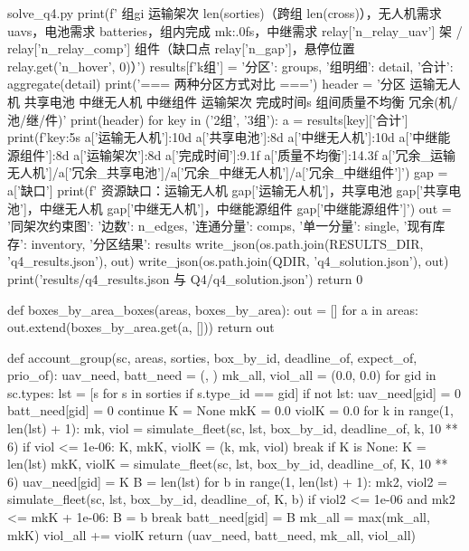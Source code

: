\documentclass[bwprint]{gmcmthesis}
\begin{document}
\begin{appendices}
\begin{Python}{solve\_q4.py}
            print(f'    组{gi} 运输架次 {len(sorties)}（跨组 {len(cross)}），无人机需求 {uavs}，电池需求 {batteries}，组内完成 {mk:.0f}s，中继需求 {relay['n_relay_uav']} 架 / {relay['n_relay_comp']} 组件（缺口点 {relay['n_gap']}，悬停位置 {relay.get('n_hover', 0)}）')
        results[f'{k}组'] = {'分区': groups, '组明细': detail, '合计': aggregate(detail)}
    print('\n=== 两种分区方式对比 ===')
    header = '分区  运输无人机 共享电池 中继无人机 中继组件 运输架次 完成时间s 组间质量不均衡 冗余(机/池/继/件)'
    print(header)
    for key in ('2组', '3组'):
        a = results[key]['合计']
        print(f'{key:5s} {a['运输无人机']:10d} {a['共享电池']:8d} {a['中继无人机']:10d} {a['中继能源组件']:8d} {a['运输架次']:8d} {a['完成时间']:9.1f} {a['质量不均衡']:14.3f} {a['冗余_运输无人机']}/{a['冗余_共享电池']}/{a['冗余_中继无人机']}/{a['冗余_中继组件']}')
        gap = a['缺口']
        print(f'      资源缺口：运输无人机 {gap['运输无人机']}，共享电池 {gap['共享电池']}，中继无人机 {gap['中继无人机']}，中继能源组件 {gap['中继能源组件']}')
    out = {'同架次约束图': {'边数': n_edges, '连通分量': comps, '单一分量': single}, '现有库存': inventory, '分区结果': results}
    write_json(os.path.join(RESULTS_DIR, 'q4_results.json'), out)
    write_json(os.path.join(QDIR, 'q4_solution.json'), out)
    print(' results/q4_results.json 与 Q4/q4_solution.json')
    return 0

def boxes_by_area_boxes(areas, boxes_by_area):
    out = []
    for a in areas:
        out.extend(boxes_by_area.get(a, []))
    return out

def account_group(sc, areas, sorties, box_by_id, deadline_of, expect_of, prio_of):
    uav_need, batt_need = ({}, {})
    mk_all, viol_all = (0.0, 0.0)
    for gid in sc.types:
        lst = [s for s in sorties if s.type_id == gid]
        if not lst:
            uav_need[gid] = 0
            batt_need[gid] = 0
            continue
        K = None
        mkK = 0.0
        violK = 0.0
        for k in range(1, len(lst) + 1):
            mk, viol = simulate_fleet(sc, lst, box_by_id, deadline_of, k, 10 ** 6)
            if viol <= 1e-06:
                K, mkK, violK = (k, mk, viol)
                break
        if K is None:
            K = len(lst)
            mkK, violK = simulate_fleet(sc, lst, box_by_id, deadline_of, K, 10 ** 6)
        uav_need[gid] = K
        B = len(lst)
        for b in range(1, len(lst) + 1):
            mk2, viol2 = simulate_fleet(sc, lst, box_by_id, deadline_of, K, b)
            if viol2 <= 1e-06 and mk2 <= mkK + 1e-06:
                B = b
                break
        batt_need[gid] = B
        mk_all = max(mk_all, mkK)
        viol_all += violK
    return (uav_need, batt_need, mk_all, viol_all)


\end{Python}
\end{appendices}
\end{document}
